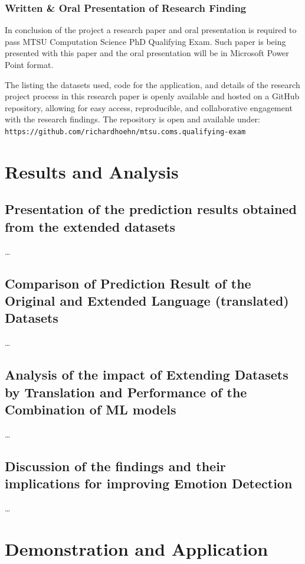 \documentclass[11pt]{article}
\begin{document}
\subsubsection{Written \& Oral Presentation of Research Finding}
In conclusion of the project a research paper and oral presentation is required to pass MTSU Computation Science PhD Qualifying Exam. Such paper is being presented with this paper and the oral presentation will be in Microsoft Power Point format.

The listing the datasets used, code for the application, and details of the research project process in this research paper is openly available and hosted on a GitHub repository, allowing for easy access, reproducible, and collaborative engagement with the research findings. The repository is open and available under: \texttt{https://github.com/richardhoehn/mtsu.coms.qualifying-exam}\cite{Hoehn_Improving_Emotion_Detection_2023}

\section{Results and Analysis}

\subsection{Presentation of the prediction results obtained from the extended datasets}

\ldots

\subsection{Comparison of Prediction Result of the Original and Extended Language (translated) Datasets}
\ldots

\subsection{Analysis of the impact of Extending Datasets by Translation and Performance of the Combination of ML models}
\ldots

\subsection{Discussion of the findings and their implications for improving Emotion Detection}
\ldots

\section{Demonstration and Application}
\end{document}
